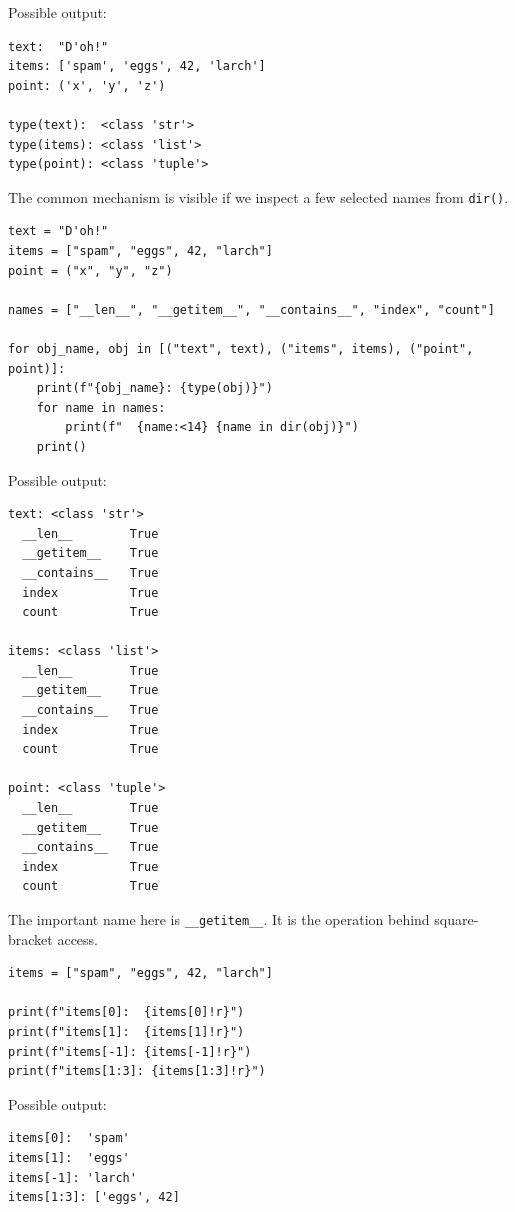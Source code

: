 Possible output:

\begin{verbatim}
text:  "D'oh!"
items: ['spam', 'eggs', 42, 'larch']
point: ('x', 'y', 'z')

type(text):  <class 'str'>
type(items): <class 'list'>
type(point): <class 'tuple'>
\end{verbatim}

The common mechanism is visible if we inspect a few selected names from \texttt{dir()}.

\begin{verbatim}
text = "D'oh!"
items = ["spam", "eggs", 42, "larch"]
point = ("x", "y", "z")

names = ["__len__", "__getitem__", "__contains__", "index", "count"]

for obj_name, obj in [("text", text), ("items", items), ("point", point)]:
    print(f"{obj_name}: {type(obj)}")
    for name in names:
        print(f"  {name:<14} {name in dir(obj)}")
    print()
\end{verbatim}

Possible output:

\begin{verbatim}
text: <class 'str'>
  __len__        True
  __getitem__    True
  __contains__   True
  index          True
  count          True

items: <class 'list'>
  __len__        True
  __getitem__    True
  __contains__   True
  index          True
  count          True

point: <class 'tuple'>
  __len__        True
  __getitem__    True
  __contains__   True
  index          True
  count          True
\end{verbatim}

The important name here is \texttt{\_\_getitem\_\_}. It is the operation behind square-bracket access.

\begin{verbatim}
items = ["spam", "eggs", 42, "larch"]

print(f"items[0]:  {items[0]!r}")
print(f"items[1]:  {items[1]!r}")
print(f"items[-1]: {items[-1]!r}")
print(f"items[1:3]: {items[1:3]!r}")
\end{verbatim}

Possible output:

\begin{verbatim}
items[0]:  'spam'
items[1]:  'eggs'
items[-1]: 'larch'
items[1:3]: ['eggs', 42]
\end{verbatim}

